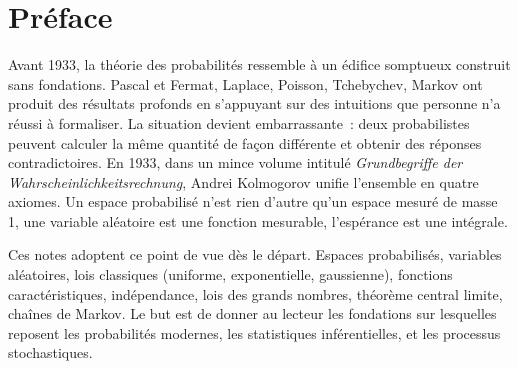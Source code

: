 \documentclass[12pt,a4paper,twoside]{book}
\theoremstyle{definition}
\theoremstyle{plain}
\theoremstyle{remark}
\begin{document}
\begin{titlepage}
\end{titlepage}

\frontmatter
\tableofcontents


\chapter*{Pr\'eface}

Avant 1933, la th\'eorie des probabilit\'es ressemble \`a un \'edifice somptueux construit sans fondations. Pascal et Fermat, Laplace, Poisson, Tchebychev, Markov ont produit des r\'esultats profonds en s'appuyant sur des intuitions que personne n'a r\'eussi \`a formaliser. La situation devient embarrassante~: deux probabilistes peuvent calculer la m\^eme quantit\'e de fa\c{c}on diff\'erente et obtenir des r\'eponses contradictoires. En 1933, dans un mince volume intitul\'e \emph{Grundbegriffe der Wahrscheinlichkeitsrechnung}, Andrei Kolmogorov unifie l'ensemble en quatre axiomes. Un espace probabilis\'e n'est rien d'autre qu'un espace mesur\'e de masse 1, une variable al\'eatoire est une fonction mesurable, l'esp\'erance est une int\'egrale.

\medskip

Ces notes adoptent ce point de vue d\`es le d\'epart. Espaces probabilis\'es, variables al\'eatoires, lois classiques (uniforme, exponentielle, gaussienne), fonctions caract\'eristiques, ind\'ependance, lois des grands nombres, th\'eor\`eme central limite, cha\^ines de Markov. Le but est de donner au lecteur les fondations sur lesquelles reposent les probabilit\'es modernes, les statistiques inf\'erentielles, et les processus stochastiques.
\end{document}
